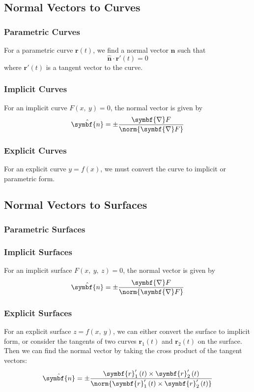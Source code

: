 \documentclass{article}
\begin{document}
\subsection{Normal Vectors to Curves}
\subsubsection{Parametric Curves}
For a parametric curve \(\symbf{r}\left( t \right)\), we find a normal
vector \(\hat{\symbf{n}}\) such that
\begin{equation*}
    \hat{\symbf{n}} \cdot \symbf{r}'\left( t \right) = 0
\end{equation*}
where \(\symbf{r}'\left( t \right)\) is a tangent vector to the curve.
\subsubsection{Implicit Curves}
For an implicit curve \(F\left( x,\: y \right) = 0\), the normal vector
is given by
\begin{equation*}
    \hat{\symbf{n}} = \pm \frac{\symbf{\nabla} F}{\norm{\symbf{\nabla} F}}
\end{equation*}
\subsubsection{Explicit Curves}
For an explicit curve \(y = f\left( x \right)\), we must convert the
curve to implicit or parametric form.
\subsection{Normal Vectors to Surfaces}
\subsubsection{Parametric Surfaces}
\subsubsection{Implicit Surfaces}
For an implicit surface \(F\left( x,\: y,\: z \right) = 0\), the normal
vector is given by
\begin{equation*}
    \hat{\symbf{n}} = \pm \frac{\symbf{\nabla} F}{\norm{\symbf{\nabla} F}}
\end{equation*}
\subsubsection{Explicit Surfaces}
For an explicit surface \(z = f\left( x,\: y \right)\), we can either
convert the surface to implicit form, or consider the tangents of two
curves \(\symbf{r}_1\left( t \right)\) and \(\symbf{r}_2\left( t
\right)\) on the surface. Then we can find the normal vector by taking
the cross product of the tangent vectors:
\begin{equation*}
    \hat{\symbf{n}} = \pm \frac{\symbf{r}_1'\left( t \right) \times \symbf{r}_2'\left( t \right)}{\norm{\symbf{r}_1'\left( t \right) \times \symbf{r}_2'\left( t \right)}}
\end{equation*}
\end{document}

